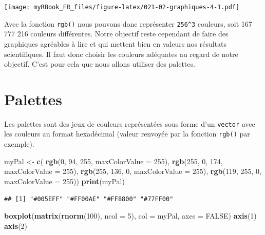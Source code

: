 \documentclass[]{book}
\newenvironment{Shaded}{\begin{snugshade}}{\end{snugshade}}
\newcommand{\DataTypeTok}[1]{\textcolor[rgb]{0.13,0.29,0.53}{#1}}
\newcommand{\DecValTok}[1]{\textcolor[rgb]{0.00,0.00,0.81}{#1}}
\newcommand{\KeywordTok}[1]{\textcolor[rgb]{0.13,0.29,0.53}{\textbf{#1}}}
\newcommand{\NormalTok}[1]{#1}
\newcommand{\OtherTok}[1]{\textcolor[rgb]{0.56,0.35,0.01}{#1}}
\newcommand{\StringTok}[1]{\textcolor[rgb]{0.31,0.60,0.02}{#1}}
\begin{document}
\texttt{[image: myRBook\_FR\_files/figure-latex/021-02-graphiques-4-1.pdf]}

Avec la fonction \texttt{rgb()} nous pouvons donc représenter \texttt{256\^{}3} couleurs, soit 167 777 216 couleurs différentes. Notre objectif reste cependant de faire des graphiques agréables à lire et qui mettent bien en valeurs nos résultats scientifiques. Il faut donc choisir les couleurs adéquates au regard de notre objectif. C'est pour cela que nous allons utiliser des palettes.

\hypertarget{palettes}{%
\section{Palettes}\label{palettes}}

Les palettes sont des jeux de couleurs représentées sous forme d'un \texttt{vector} avec les couleurs au format hexadécimal (valeur renvoyée par la fonction \texttt{rgb()} par exemple).

\begin{Shaded}
\begin{Highlighting}[]
\NormalTok{myPal <-}\StringTok{ }\KeywordTok{c}\NormalTok{(}
  \KeywordTok{rgb}\NormalTok{(}\DecValTok{0}\NormalTok{, }\DecValTok{94}\NormalTok{, }\DecValTok{255}\NormalTok{, }\DataTypeTok{maxColorValue =} \DecValTok{255}\NormalTok{),  }
  \KeywordTok{rgb}\NormalTok{(}\DecValTok{255}\NormalTok{, }\DecValTok{0}\NormalTok{, }\DecValTok{174}\NormalTok{, }\DataTypeTok{maxColorValue =} \DecValTok{255}\NormalTok{),  }
  \KeywordTok{rgb}\NormalTok{(}\DecValTok{255}\NormalTok{, }\DecValTok{136}\NormalTok{, }\DecValTok{0}\NormalTok{, }\DataTypeTok{maxColorValue =} \DecValTok{255}\NormalTok{),  }
  \KeywordTok{rgb}\NormalTok{(}\DecValTok{119}\NormalTok{, }\DecValTok{255}\NormalTok{, }\DecValTok{0}\NormalTok{, }\DataTypeTok{maxColorValue =} \DecValTok{255}\NormalTok{))}
\KeywordTok{print}\NormalTok{(myPal)}
\end{Highlighting}
\end{Shaded}

\begin{verbatim}
## [1] "#005EFF" "#FF00AE" "#FF8800" "#77FF00"
\end{verbatim}

\begin{Shaded}
\begin{Highlighting}[]
\KeywordTok{boxplot}\NormalTok{(}\KeywordTok{matrix}\NormalTok{(}\KeywordTok{rnorm}\NormalTok{(}\DecValTok{100}\NormalTok{), }\DataTypeTok{ncol =} \DecValTok{5}\NormalTok{), }\DataTypeTok{col =}\NormalTok{ myPal, }\DataTypeTok{axes =} \OtherTok{FALSE}\NormalTok{)}
\KeywordTok{axis}\NormalTok{(}\DecValTok{1}\NormalTok{)}
\KeywordTok{axis}\NormalTok{(}\DecValTok{2}\NormalTok{)}
\end{Highlighting}
\end{Shaded}
\end{document}
